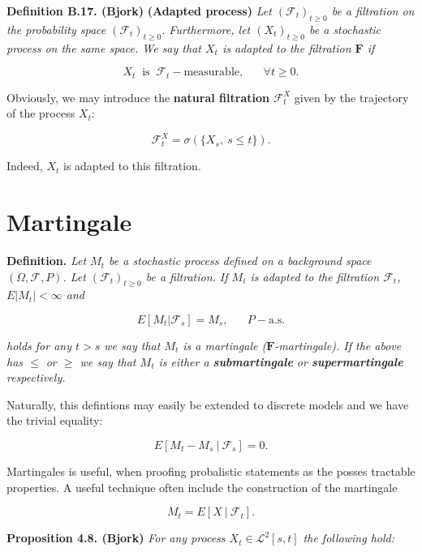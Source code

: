 \documentclass[a4paper,10pt,openany]{book}
\begin{document}
\textbf{Definition B.17. (Bjork)} \textbf{(Adapted process)} \emph{Let \((\mathcal{F}_t)_{t\ge 0}\) be a filtration on the probability space \((\mathcal{F}_t)_{t\ge 0}\). Furthermore, let \((X_t)_{t\ge 0}\) be a stochastic process on the same space. We say that \(X_t\) is adapted to the filtration \(\mathbf{F}\) if}

\[
X_t\ \text{ is }\ \mathcal{F}_t-\text{measurable},\hspace{20pt}\forall t\ge 0.
\]

Obviously, we may introduce the \textbf{natural filtration} \(\mathcal{F}^X_t\) given by the trajectory of the process \(X_t\):

\[
\mathcal{F}^X_t=\sigma(\{X_s,\ s\le t\}).
\]

Indeed, \(X_t\) is adapted to this filtration.

\hypertarget{martingale}{%
\section{Martingale}\label{martingale}}

\textbf{Definition.} \emph{Let \(M_t\) be a stochastic process defined on a background space \((\Omega,\mathcal{F},P)\). Let \((\mathcal{F}_t)_{t\ge 0}\) be a filtration. If \(M_t\) is adapted to the filtration \(\mathcal{F}_t\), \(E\vert M_t\vert <\infty\) and}

\[
E[M_t\vert \mathcal{F}_s]=M_s,\hspace{20pt}P-\text{a.s.}
\]

\emph{holds for any \(t>s\) we say that \(M_t\) is a martingale (\(\mathbf{F}\)-martingale). If the above has \(\le\) or \(\ge\) we say that \(M_t\) is either a \textbf{submartingale} or \textbf{supermartingale} respectively.}

Naturally, this defintions may easily be extended to discrete models and we have the trivial equality:

\[
E[M_t-M_s\ \vert\ \mathcal{F}_s]=0.
\]

Martingales is useful, when proofing probalistic statements as the posses tractable properties. A useful technique often include the construction of the martingale

\[
M_t=E[X\ \vert\ \mathcal{F}_t].
\]

\textbf{Proposition 4.8. (Bjork)} \emph{For any process \(X_t\in\mathcal{L}^2[s,t]\) the following hold:}
\end{document}
